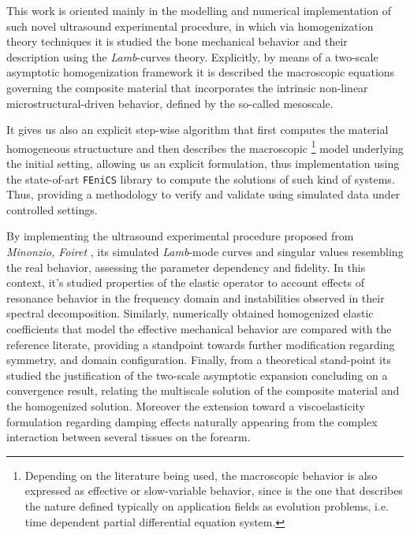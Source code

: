 \begin{intro}
This work is oriented mainly in the modelling and numerical implementation of such novel ultrasound experimental procedure, in which via homogenization theory techniques it is studied the bone mechanical behavior and their description using the \textit{Lamb}-curves theory. Explicitly, by means of a two-scale asymptotic homogenization framework it is described the macroscopic equations governing the composite material that incorporates the intrinsic non-linear microstructural-driven behavior, defined by the so-called mesoscale.

It gives us also an explicit step-wise algorithm that first computes the material homogeneous structucture and then describes the macroscopic \footnote{Depending on the literature being used, the macroscopic behavior is also expressed as effective or slow-variable behavior, since is the one that describes the nature defined typically on application fields as evolution problems, i.e. time dependent partial differential equation system.} model underlying the initial setting, allowing us an explicit formulation, thus implementation using the state-of-art \texttt{FEniCS} \cite{logg2012automated} library to compute the solutions of such kind of systems. Thus, providing a methodology to verify and validate using simulated data under controlled settings.

By implementing the ultrasound experimental procedure proposed from \textit{Minonzio, Foiret} \cite{Foiret2014}, \cite{Minonzio2018} its simulated  \textit{Lamb}-mode curves and singular values resembling the real behavior, assessing the parameter dependency and fidelity. In this context, it's studied properties of the elastic operator to account effects of resonance behavior in the frequency domain and instabilities observed in their spectral decomposition.
Similarly, numerically obtained homogenized elastic coefficients that model the effective mechanical behavior are compared with the reference literate, providing a standpoint towards further modification regarding symmetry, and domain configuration.
Finally, from a theoretical stand-point its studied the justification of the two-scale asymptotic expansion concluding on a convergence result, relating the multiscale solution of the composite material and the homogenized solution. Moreover the extension toward a viscoelasticity formulation regarding damping effects naturally appearing from the complex interaction between several tissues on the forearm.

\end{intro}